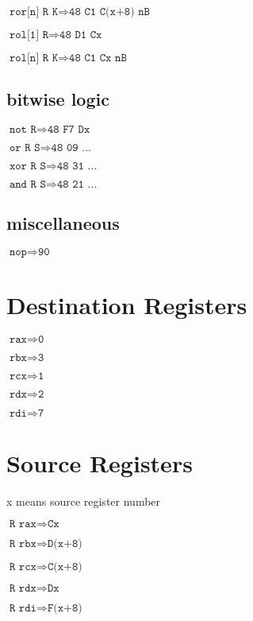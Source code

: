 \documentclass{article}
\begin{document}
$\texttt{ror[n] R K} \Rightarrow \texttt{48 C1 C(x+8) nB}$

$\texttt{rol[1] R} \Rightarrow \texttt{48 D1 Cx}$

$\texttt{rol[n] R K} \Rightarrow \texttt{48 C1 Cx nB}$


\subsection*{bitwise logic}

$\texttt{not R} \Rightarrow \texttt{48 F7 Dx}$

$\texttt{or R S} \Rightarrow \texttt{48 09 ...}$

$\texttt{xor R S} \Rightarrow \texttt{48 31 ...}$

$\texttt{and R S} \Rightarrow \texttt{48 21 ...}$


\subsection*{miscellaneous}

$\texttt{nop} \Rightarrow \texttt{90}$


\section*{Destination Registers}
\begin{minipage}{\textwidth}

$\texttt{rax} \Rightarrow \texttt{0}$

$\texttt{rbx} \Rightarrow \texttt{3}$

$\texttt{rcx} \Rightarrow \texttt{1}$

$\texttt{rdx} \Rightarrow \texttt{2}$

$\texttt{rdi} \Rightarrow \texttt{7}$
\end{minipage}


\section*{Source Registers}
\begin{minipage}{\textwidth}

x means source register number

$\texttt{R rax} \Rightarrow \texttt{Cx}$

$\texttt{R rbx} \Rightarrow \texttt{D(x+8)}$

$\texttt{R rcx} \Rightarrow \texttt{C(x+8)}$

$\texttt{R rdx} \Rightarrow \texttt{Dx}$

$\texttt{R rdi} \Rightarrow \texttt{F(x+8)}$

\end{minipage}
\end{document}
